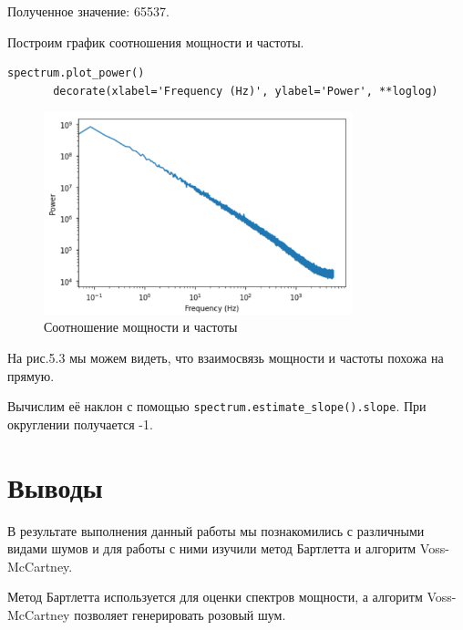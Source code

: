 \documentclass[a4paper,12pt]{report}
\begin{document}
    Полученное значение: 65537.
    
    Построим график соотношения мощности и частоты.
\begin{lstlisting}[caption=Построение соотношения мощности и частоты]
       spectrum.plot_power()
       decorate(xlabel='Frequency (Hz)', ylabel='Power', **loglog)
\end{lstlisting}
\begin{figure}[H]
        \centering
        \includegraphics[width=0.8\textwidth]{fig5-3.PNG}
        \caption{Соотношение мощности и частоты}
        \label{fig:fig5-3}
\end{figure} 

    На рис.5.3 мы можем видеть, что взаимосвязь мощности и частоты похожа на прямую.
    
    Вычислим её наклон с помощью \texttt{spectrum.estimate\_slope().slope}. При округлении получается -1.

\chapter{Выводы}
    В результате выполнения данный работы мы познакомились с различными видами шумов и для работы с ними изучили метод Бартлетта и алгоритм Voss-McCartney.
    
    Метод Бартлетта используется для оценки спектров мощности, а алгоритм Voss-McCartney позволяет генерировать розовый шум.
\end{document}

